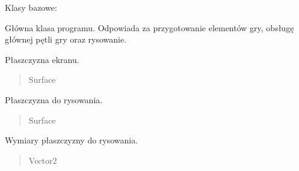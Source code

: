 \documentclass[letterpaper,10pt,polish]{sphinxmanual}
\begin{document}
\begin{fulllineitems}
\label{\detokenize{main:main.Main}}
\pysigstartsignatures
{}
\pysigstopsignatures
\sphinxAtStartPar
Klasy bazowe: 

\sphinxAtStartPar
Główna klasa programu. Odpowiada za przygotowanie elementów gry, obsługę
głównej pętli gry oraz rysowanie.

\begin{fulllineitems}
\label{\detokenize{main:main.Main.screen}}
\pysigstartsignatures
{}
\pysigstopsignatures
\sphinxAtStartPar
Płaszczyzna ekranu.
\begin{quote}\begin{description}
\sphinxAtStartPar
Surface

\end{description}\end{quote}

\end{fulllineitems}


\begin{fulllineitems}
\label{\detokenize{main:main.Main.draw_screen}}
\pysigstartsignatures
{}
\pysigstopsignatures
\sphinxAtStartPar
Płaszczyzna do rysowania.
\begin{quote}\begin{description}
\sphinxAtStartPar
Surface

\end{description}\end{quote}

\end{fulllineitems}


\begin{fulllineitems}
\label{\detokenize{main:main.Main.draw_screen_size}}
\pysigstartsignatures
{}
\pysigstopsignatures
\sphinxAtStartPar
Wymiary płaszczyzny do rysowania.
\begin{quote}\begin{description}
\sphinxAtStartPar
Vector2


\end{description}
\end{quote}
\end{fulllineitems}
\end{fulllineitems}
\end{document}
